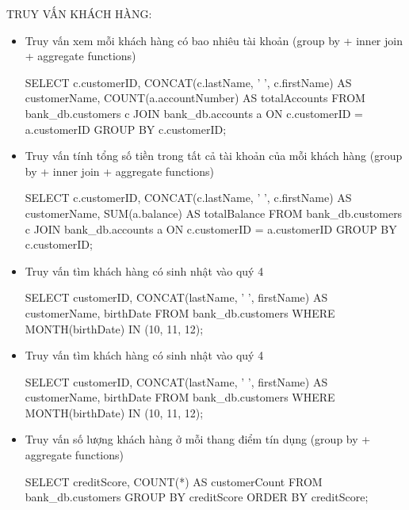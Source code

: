 
TRUY VẤN KHÁCH HÀNG:
\begin{itemize}

    \item Truy vấn xem mỗi khách hàng có bao nhiêu tài khoản (group by + inner join + aggregate functions)
    \begin{MySQLCode}
    SELECT 
        c.customerID,
        CONCAT(c.lastName, ' ', c.firstName) AS customerName,
        COUNT(a.accountNumber) AS totalAccounts
    FROM 
        bank_db.customers c
    JOIN 
        bank_db.accounts a ON c.customerID = a.customerID
    GROUP BY 
        c.customerID;
    \end{MySQLCode}

    \item Truy vấn tính tổng số tiền trong tất cả tài khoản của mỗi khách hàng (group by + inner join + aggregate functions)
    \begin{MySQLCode}
    SELECT 
        c.customerID,
	CONCAT(c.lastName, ' ', c.firstName) AS customerName,
        SUM(a.balance) AS totalBalance
    FROM 
        bank_db.customers c
    JOIN 
        bank_db.accounts a ON c.customerID = a.customerID
    GROUP BY 
	c.customerID;
    \end{MySQLCode}

    \item Truy vấn tìm khách hàng có sinh nhật vào quý 4
    \begin{MySQLCode}
    SELECT 
        customerID,
        CONCAT(lastName, ' ', firstName) AS customerName,
        birthDate
    FROM 
        bank_db.customers
    WHERE 
        MONTH(birthDate) IN (10, 11, 12);
    \end{MySQLCode}

    \item Truy vấn tìm khách hàng có sinh nhật vào quý 4
    \begin{MySQLCode}
    SELECT 
        customerID,
        CONCAT(lastName, ' ', firstName) AS customerName,
        birthDate
    FROM 
        bank_db.customers
    WHERE 
        MONTH(birthDate) IN (10, 11, 12);
    \end{MySQLCode}

     \item Truy vấn số lượng khách hàng ở mỗi thang điểm tín dụng (group by + aggregate functions)
    \begin{MySQLCode}
    SELECT 
        creditScore,
        COUNT(*) AS customerCount
    FROM 
        bank_db.customers
    GROUP BY 
        creditScore
    ORDER BY 
        creditScore;
    \end{MySQLCode}


\end{itemize}
